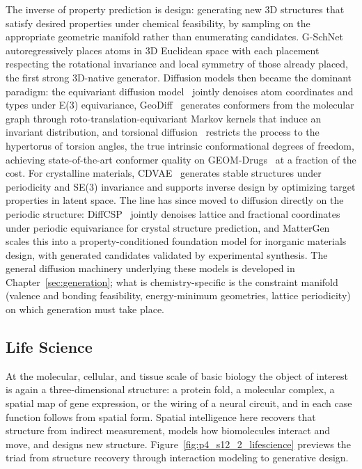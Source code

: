 The inverse of property prediction is design: generating new 3D structures that satisfy desired properties under chemical feasibility, by sampling on the appropriate geometric manifold rather than enumerating candidates.
G-SchNet~\cite{gebauer2019symmetry} autoregressively places atoms in 3D Euclidean space with each placement respecting the rotational invariance and local symmetry of those already placed, the first strong 3D-native generator.
Diffusion models then became the dominant paradigm: the equivariant diffusion model~\cite{hoogeboom2022equivariant} jointly denoises atom coordinates and types under E(3) equivariance, GeoDiff~\cite{xu2022geodiff} generates conformers from the molecular graph through roto-translation-equivariant Markov kernels that induce an invariant distribution, and torsional diffusion~\cite{jing2022torsional} restricts the process to the hypertorus of torsion angles, the true intrinsic conformational degrees of freedom, achieving state-of-the-art conformer quality on GEOM-Drugs~\cite{axelrod2022geom} at a fraction of the cost.
For crystalline materials, CDVAE~\cite{xie2022crystal} generates stable structures under periodicity and SE(3) invariance and supports inverse design by optimizing target properties in latent space.
The line has since moved to diffusion directly on the periodic structure: DiffCSP~\cite{jiao2023crystal} jointly denoises lattice and fractional coordinates under periodic equivariance for crystal structure prediction, and MatterGen~\cite{zeni2025generative} scales this into a property-conditioned foundation model for inorganic materials design, with generated candidates validated by experimental synthesis.
The general diffusion machinery underlying these models is developed in Chapter~\ref{sec:generation}; what is chemistry-specific is the constraint manifold (valence and bonding feasibility, energy-minimum geometries, lattice periodicity) on which generation must take place.


\subsection{Life Science}
\label{subsec:p4-sec12-2-life-science}

At the molecular, cellular, and tissue scale of basic biology the object of interest is again a three-dimensional structure: a protein fold, a molecular complex, a spatial map of gene expression, or the wiring of a neural circuit, and in each case function follows from spatial form.
Spatial intelligence here recovers that structure from indirect measurement, models how biomolecules interact and move, and designs new structure.
Figure~\ref{fig:p4_s12_2_lifescience} previews the triad from structure recovery through interaction modeling to generative design.


